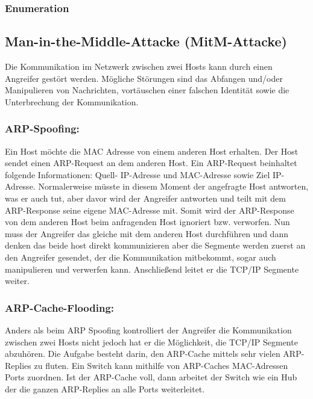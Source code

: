 \subsubsection{Enumeration}

\subsection{Man-in-the-Middle-Attacke (MitM-Attacke)}
Die Kommunikation im Netzwerk zwischen zwei Hosts kann durch einen Angreifer gestört werden. Mögliche Störungen sind das Abfangen und/oder Manipulieren von Nachrichten, vortäuschen einer falschen Identität sowie die Unterbrechung der Kommunikation.\cite{ref_book_attack_1} \par

\subsubsection{ARP-Spoofing:}
Ein Host möchte die MAC Adresse von einem anderen Host erhalten. Der Host sendet einen ARP-Request an dem anderen Host. Ein ARP-Request beinhaltet folgende Informationen: Quell- IP-Adresse und MAC-Adresse sowie Ziel IP-Adresse. Normalerweise müsste in diesem Moment der angefragte Host antworten, was er auch tut, aber davor wird der Angreifer antworten und teilt mit dem ARP-Response seine eigene MAC-Adresse mit. Somit wird der ARP-Response von dem anderen Host beim anfragenden Host ignoriert bzw. verworfen. Nun muss der Angreifer das gleiche mit dem anderen Host durchführen und dann denken das beide host direkt kommunizieren aber die Segmente werden zuerst an den Angreifer gesendet, der die Kommunikation mitbekommt, sogar auch manipulieren und verwerfen kann. Anschließend leitet er die TCP/IP Segmente weiter.\cite{ref_book_attack_4} \par

\subsubsection{ARP-Cache-Flooding:}
Anders als beim ARP Spoofing kontrolliert der Angreifer die Kommunikation zwischen zwei Hosts nicht jedoch hat er die Möglichkeit, die TCP/IP Segmente abzuhören. Die Aufgabe besteht darin, den ARP-Cache mittels sehr vielen ARP-Replies zu fluten. Ein Switch kann mithilfe von ARP-Caches MAC-Adressen Ports zuordnen. Ist der ARP-Cache voll, dann arbeitet der Switch wie ein Hub der die ganzen ARP-Replies an alle Ports weiterleitet.\cite{ref_book_attack_5} \par

